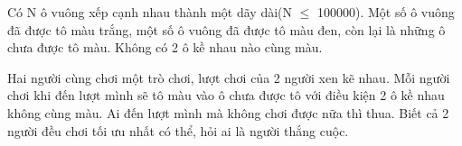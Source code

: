 Có N ô vuông xếp cạnh nhau thành một dãy dài(N $\le$ 100000). Một số ô vuông đã được tô màu trắng, một số ô vuông đã được tô màu đen, còn lại là những ô chưa được tô màu. Không có 2 ô kề nhau nào cùng màu.   


   Hai người cùng chơi một trò chơi, lượt chơi của 2 người xen kẽ nhau. Mỗi người chơi khi đến lượt mình sẽ tô màu vào ô chưa được tô với điều kiện 2 ô kề nhau không cùng màu. Ai đến lượt mình mà không chơi được nữa thì thua. Biết cả 2 người đều chơi tối ưu nhất có thể, hỏi ai là người thắng cuộc.